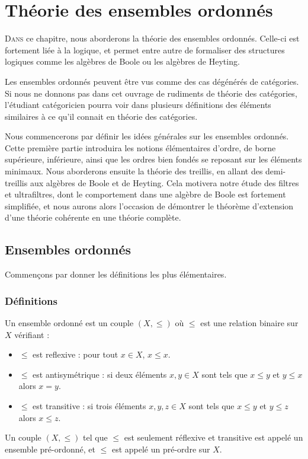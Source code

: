 \chapter{Théorie des ensembles ordonnés}
\label{chp.ordres}

\minitoc

\lettrine{D}{ans} ce chapitre, nous aborderons la théorie des ensembles ordonnés.
Celle-ci est fortement liée à la logique, et permet entre autre de formaliser des
structures logiques comme les algèbres de Boole ou les algèbres de Heyting. 

Les ensembles ordonnés peuvent être vus comme des cas dégénérés de catégories. Si
nous ne donnons pas dans cet ouvrage de rudiments de théorie des catégories,
l'étudiant catégoricien pourra voir dans plusieurs définitions des éléments
similaires à ce qu'il connait en théorie des catégories.

Nous commencerons par définir les idées générales sur les ensembles ordonnés.
Cette première partie introduira les notions élémentaires d'ordre, de borne
supérieure, inférieure, ainsi que les ordres bien fondés se reposant sur les
éléments minimaux.
Nous aborderons ensuite la théorie des treillis, en allant des demi-treillis aux
algèbres de Boole et de Heyting.
Cela motivera notre étude des filtres et ultrafiltres, dont le comportement dans
une algèbre de Boole est fortement simplifiée, et nous aurons alors l'occasion
de démontrer le théorème d'extension d'une théorie cohérente en une théorie
complète.

\section{Ensembles ordonnés}

Commençons par donner les définitions les plus élémentaires.

\subsection{Définitions}

\begin{definition}
  Un ensemble ordonné est un couple $(X,\leq)$ où $\leq$ est une relation binaire
  sur $X$ vérifiant :
  \begin{itemize}
  \item $\leq$ est reflexive : pour tout $x\in X$, $x\leq x$.
  \item $\leq$ est antisymétrique : si deux éléments $x,y\in X$ sont tels que
    $x\leq y$ et $y\leq x$ alors $x = y$.
  \item $\leq$ est transitive : si trois éléments $x,y,z\in X$ sont tels que
    $x\leq y$ et $y\leq z$ alors $x\leq z$.
  \end{itemize}

  Un couple $(X,\leq)$ tel que $\leq$ est seulement réflexive et transitive est
  appelé un ensemble pré-ordonné, et $\leq$ est appelé un pré-ordre sur $X$.
\end{definition}

